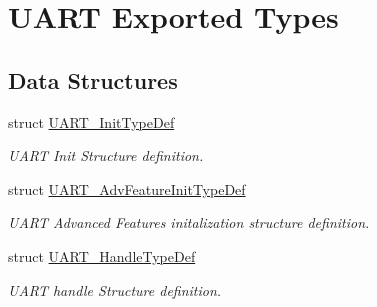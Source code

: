 \hypertarget{group___u_a_r_t___exported___types}{}\section{U\+A\+RT Exported Types}
\label{group___u_a_r_t___exported___types}
\subsection*{Data Structures}
\begin{DoxyCompactItemize}
\item 
struct \hyperlink{struct_u_a_r_t___init_type_def}{U\+A\+R\+T\+\_\+\+Init\+Type\+Def}
\begin{DoxyCompactList}\small\item\em U\+A\+RT Init Structure definition. \end{DoxyCompactList}\item 
struct \hyperlink{struct_u_a_r_t___adv_feature_init_type_def}{U\+A\+R\+T\+\_\+\+Adv\+Feature\+Init\+Type\+Def}
\begin{DoxyCompactList}\small\item\em U\+A\+RT Advanced Features initalization structure definition. \end{DoxyCompactList}\item 
struct \hyperlink{struct_u_a_r_t___handle_type_def}{U\+A\+R\+T\+\_\+\+Handle\+Type\+Def}
\begin{DoxyCompactList}\small\item\em U\+A\+RT handle Structure definition. \end{DoxyCompactList}\end{DoxyCompactItemize}
